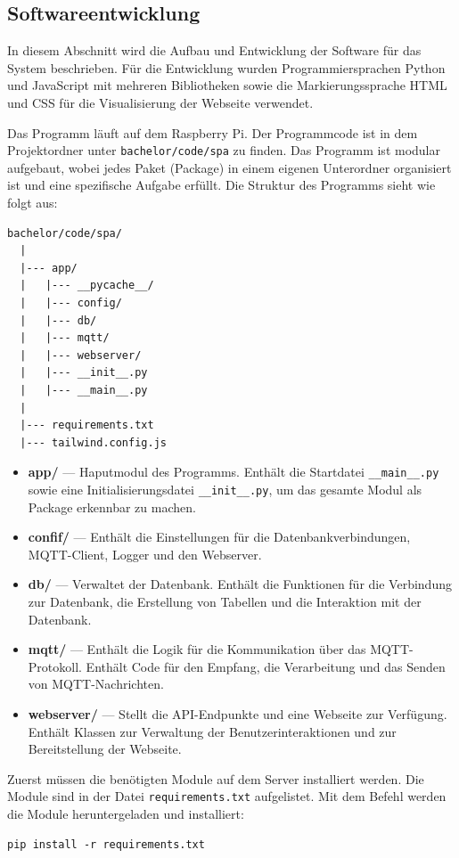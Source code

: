 \documentclass[12pt, letterpaper]{article}
\begin{document}
\subsection{Softwareentwicklung}
\par In diesem Abschnitt wird die Aufbau und Entwicklung der Software für das System beschrieben. Für die Entwicklung wurden Programmiersprachen Python und JavaScript mit mehreren Bibliotheken sowie die Markierungssprache HTML und CSS für die Visualisierung der Webseite verwendet.
\par Das Programm läuft auf dem Raspberry Pi. Der Programmcode ist in dem Projektordner unter \texttt{bachelor/code/spa} zu finden. Das Programm ist modular aufgebaut, wobei jedes Paket (Package) in einem eigenen Unterordner organisiert ist und eine spezifische Aufgabe erfüllt. Die Struktur des Programms sieht wie folgt aus:
\begin{Verbatim}[frame=single]
  bachelor/code/spa/
  |
  |--- app/
  |   |--- __pycache__/
  |   |--- config/
  |   |--- db/
  |   |--- mqtt/
  |   |--- webserver/
  |   |--- __init__.py
  |   |--- __main__.py
  |
  |--- requirements.txt
  |--- tailwind.config.js  
\end{Verbatim}
\begin{itemize}
  \item \textbf{app/} --- Haputmodul des Programms. Enthält die Startdatei \texttt{\_\_main\_\_.py} sowie eine Initialisierungsdatei \texttt{\_\_init\_\_.py}, um das gesamte Modul als Package erkennbar zu machen.
  \item \textbf{confif/} --- Enthält die Einstellungen für die Datenbankverbindungen, MQTT-Client, Logger und den Webserver.
  \item \textbf{db/} --- Verwaltet der Datenbank. Enthält die Funktionen für die Verbindung zur Datenbank, die Erstellung von Tabellen und die Interaktion mit der Datenbank.
  \item \textbf{mqtt/} --- Enthält die Logik für die Kommunikation über das MQTT-Protokoll. Enthält Code für den Empfang, die Verarbeitung und das Senden von MQTT-Nachrichten.
  \item \textbf{webserver/} --- Stellt die API-Endpunkte und eine Webseite zur Verfügung. Enthält Klassen zur Verwaltung der Benutzerinteraktionen und zur Bereitstellung der Webseite.
\end{itemize} 
\par Zuerst müssen die benötigten Module auf dem Server installiert werden. Die Module sind in der Datei \texttt{requirements.txt} aufgelistet. Mit dem Befehl werden die Module heruntergeladen und installiert:
\begin{Verbatim}[frame=single]
  pip install -r requirements.txt
\end{Verbatim}
\end{document}
